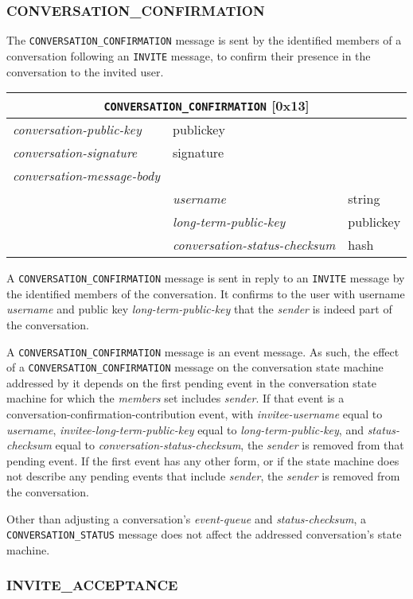 \documentclass{article}
\def\message#1{\texttt{#1}}
\def\field#1{\textit{#1}}
\def\smfield#1{\textsl{#1}}
\def\type#1{\textsf{#1}}
\newenvironment{conversationmessage}[2]{
\newcommand{\messagefield}[2]{
& \field{##1} & \type{##2} \\
\hline
}
\hspace{2em minus 2em}\begin{tabular}{|l|l|l|}
\hline
\multicolumn{3}{|c|}{\message{#1} [#2]} \\
\hline
\hline
\field{conversation-public-key} & \multicolumn{2}{l|}{\type{publickey}} \\
\hline
\field{conversation-signature} & \multicolumn{2}{l|}{\type{signature}} \\
\hline
\field{conversation-message-body} & \multicolumn{2}{l|}{} \\
\hline
}{
\end{tabular}
}
\begin{document}
\subsubsection{CONVERSATION\_CONFIRMATION}
\label{sec:messages/conversation-confirmation}

The \message{CONVERSATION\_CONFIRMATION} message is sent by the identified members of a conversation following an \message{INVITE} message, to confirm their presence in the conversation to the invited user.

\begin{conversationmessage}{CONVERSATION\_CONFIRMATION}{0x13}
\messagefield{username}{string}
\messagefield{long-term-public-key}{publickey}
\messagefield{conversation-status-checksum}{hash}
\end{conversationmessage}

A \message{CONVERSATION\_CONFIRMATION} message is sent in reply to an \message{INVITE} message by the identified members of the conversation.
It confirms to the user with username \field{username} and public key \field{long-term-public-key} that the \field{sender} is indeed part of the conversation.

A \message{CONVERSATION\_CONFIRMATION} message is an event message.
As such, the effect of a \message{CONVERSATION\_CONFIRMATION} message on the conversation state machine addressed by it depends on the first pending event in the conversation state machine for which the \smfield{members} set includes \field{sender}.
If that event is a \type{conversation-confirmation-contribution} event, with \smfield{invitee-username} equal to \field{username}, \smfield{invitee-long-term-public-key} equal to \field{long-term-public-key}, and \smfield{status-checksum} equal to \field{conversation-status-checksum}, the \field{sender} is removed from that pending event.
If the first event has any other form, or if the state machine does not describe any pending events that include \field{sender}, the \field{sender} is removed from the conversation.

Other than adjusting a conversation's \smfield{event-queue} and \smfield{status-checksum}, a \message{CONVERSATION\_STATUS} message does not affect the addressed conversation's state machine.


\subsubsection{INVITE\_ACCEPTANCE}
\label{sec:messages/invite-acceptance}
\end{document}
